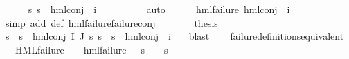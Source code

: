 \begin{isabellebody}
\ \ \ \ \isamarkupfalse%
\ {\isachardoublequoteopen}{\isasymforall}s{\isachardot}{\kern0pt}\ {\isasymnot}{\isacharparenleft}{\kern0pt}s\ {\isasymTurnstile}\ {\isacharparenleft}{\kern0pt}hml{\isacharunderscore}{\kern0pt}conj\ {\isacharbraceleft}{\kern0pt}{\isacharbraceright}{\kern0pt}\ {\isacharbraceleft}{\kern0pt}i{\isacharunderscore}{\kern0pt}{\isasymphi}{\isacharbraceright}{\kern0pt}\ {\isasymPsi}{\isacharparenright}{\kern0pt}{\isacharparenright}{\kern0pt}{\isachardoublequoteclose}\ \isanewline
\ \ \ \ \ \ \isamarkupfalse%
\ auto\isanewline
\ \ \ \ \isamarkupfalse%
\ {\isachardoublequoteopen}hml{\isacharunderscore}{\kern0pt}failure\ {\isacharparenleft}{\kern0pt}hml{\isacharunderscore}{\kern0pt}conj\ {\isacharbraceleft}{\kern0pt}{\isacharbraceright}{\kern0pt}\ {\isacharbraceleft}{\kern0pt}i{\isacharunderscore}{\kern0pt}{\isasymphi}{\isacharbraceright}{\kern0pt}\ {\isasymPsi}{\isacharparenright}{\kern0pt}{\isachardoublequoteclose}\ \isanewline
\ \ \ \ \ \ \isamarkupfalse%
\ {\isacharparenleft}{\kern0pt}simp\ add{\isacharcolon}{\kern0pt}\ {\isasymPsi}{\isacharunderscore}{\kern0pt}def\ hml{\isacharunderscore}{\kern0pt}failure{\isachardot}{\kern0pt}failure{\isacharunderscore}{\kern0pt}conj{\isacharparenright}{\kern0pt}\isanewline
\ \ \ \ \isamarkupfalse%
\ \isamarkupfalse%
\ {\isacharquery}{\kern0pt}thesis\ \isanewline
\ \ \ \ \ \ \isamarkupfalse%
\ {\isacartoucheopen}{\isasymforall}s{\isachardot}{\kern0pt}\ {\isasymnot}\ s\ {\isasymTurnstile}\ hml{\isacharunderscore}{\kern0pt}conj\ I\ J\ {\isasympsi}s{\isacartoucheclose}\ {\isacartoucheopen}{\isasymforall}s{\isachardot}{\kern0pt}\ {\isasymnot}\ s\ {\isasymTurnstile}\ hml{\isacharunderscore}{\kern0pt}conj\ {\isacharbraceleft}{\kern0pt}{\isacharbraceright}{\kern0pt}\ {\isacharbraceleft}{\kern0pt}i{\isacharunderscore}{\kern0pt}{\isasymphi}{\isacharbraceright}{\kern0pt}\ {\isasymPsi}{\isacartoucheclose}\ \isamarkupfalse%
\ blast\isanewline
\ \ \isamarkupfalse%
\isanewline
{}\isamarkupfalse%
%
\endisatagproof
{\isafoldproof}%
%
\isadelimproof
\isanewline
%
\endisadelimproof
\isanewline
{}\isamarkupfalse%
\ failure{\isacharunderscore}{\kern0pt}definitions{\isacharunderscore}{\kern0pt}equivalent{\isacharcolon}{\kern0pt}\ \isanewline
\ \ {\isachardoublequoteopen}{\isasymforall}{\isasymphi}{\isachardot}{\kern0pt}\ {\isacharparenleft}{\kern0pt}HML{\isacharunderscore}{\kern0pt}failure\ {\isasymphi}\ {\isasymlongrightarrow}\ {\isacharparenleft}{\kern0pt}{\isasymexists}{\isasympsi}{\isachardot}{\kern0pt}\ hml{\isacharunderscore}{\kern0pt}failure\ {\isasympsi}\ {\isasymand}\ {\isacharparenleft}{\kern0pt}s\ {\isasymTurnstile}\ {\isasympsi}\ {\isasymlongleftrightarrow}\ s\ {\isasymTurnstile}\ {\isasymphi}{\isacharparenright}{\kern0pt}{\isacharparenright}{\kern0pt}{\isacharparenright}{\kern0pt}{\isachardoublequoteclose}\isanewline

\end{isabellebody}
